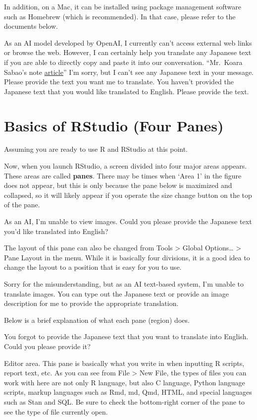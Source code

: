 \documentclass[
  a4paper,
]{book}
\begin{document}
In addition, on a Mac, it can be installed using package management
software such as Homebrew (which is recommended). In that case, please
refer to the documents below.

As an AI model developed by OpenAI, I currently can't access external
web links or browse the web. However, I can certainly help you translate
any Japanese text if you are able to directly copy and paste it into our
conversation. ``Mr.~Koara Sabao's note
\href{https://note.com/mackerelman/n/nfbf8054e90d5}{article}'' I'm
sorry, but I can't see any Japanese text in your message. Please provide
the text you want me to translate. You haven't provided the Japanese
text that you would like translated to English. Please provide the text.

\section{Basics of RStudio (Four
Panes)}\label{basics-of-rstudio-four-panes}

Assuming you are ready to use R and RStudio at this point.

Now, when you launch RStudio, a screen divided into four major areas
appears. These areas are called \textbf{panes}. There may be times when
`Area 1' in the figure does not appear, but this is only because the
pane below is maximized and collapsed, so it will likely appear if you
operate the size change button on the top of the pane.

As an AI, I'm unable to view images. Could you please provide the
Japanese text you'd like translated into English?

The layout of this pane can also be changed from Tools \textgreater{}
Global Options\ldots{} \textgreater{} Pane Layout in the menu. While it
is basically four divisions, it is a good idea to change the layout to a
position that is easy for you to use.

Sorry for the misunderstanding, but as an AI text-based system, I'm
unable to translate images. You can type out the Japanese text or
provide an image description for me to provide the appropriate
translation.

Below is a brief explanation of what each pane (region) does.

You forgot to provide the Japanese text that you want to translate into
English. Could you please provide it?

Editor area. This pane is basically what you write in when inputting R
scripts, report text, etc. As you can see from File \textgreater{} New
File, the types of files you can work with here are not only R language,
but also C language, Python language scripts, markup languages such as
Rmd, md, Qmd, HTML, and special languages such as Stan and SQL. Be sure
to check the bottom-right corner of the pane to see the type of file
currently open.
\end{document}
